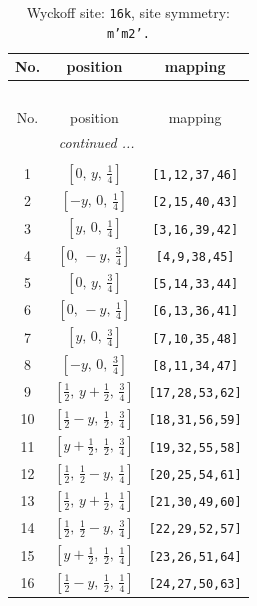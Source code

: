 \documentclass[fleqn,8pt]{jsarticle}
\begin{document}
\renewcommand{\arraystretch}{1.2}
\begin{longtable}{ccc}
\caption{Wyckoff site: {\tt 16k}, site symmetry: {\tt m'm2'.}}
 \\
 \hline \hline
No. & position & mapping \\ \hline \endfirsthead

\multicolumn{2}{l}{\tablename\ \thetable{}} \\
 \hline \hline
No. & position & mapping \\ \hline \endhead

 \hline \hline
\multicolumn{2}{r}{\footnotesize\it continued ...} \\ \endfoot

 \hline \hline
\multicolumn{2}{r}{} \\ \endlastfoot

1 & $\left[ 0,\, y,\, \frac{1}{4} \right]$ & {\tt [1,12,37,46]} \\ \hline
2 & $\left[ - y,\, 0,\, \frac{1}{4} \right]$ & {\tt [2,15,40,43]} \\ \hline
3 & $\left[ y,\, 0,\, \frac{1}{4} \right]$ & {\tt [3,16,39,42]} \\ \hline
4 & $\left[ 0,\, - y,\, \frac{3}{4} \right]$ & {\tt [4,9,38,45]} \\ \hline
5 & $\left[ 0,\, y,\, \frac{3}{4} \right]$ & {\tt [5,14,33,44]} \\ \hline
6 & $\left[ 0,\, - y,\, \frac{1}{4} \right]$ & {\tt [6,13,36,41]} \\ \hline
7 & $\left[ y,\, 0,\, \frac{3}{4} \right]$ & {\tt [7,10,35,48]} \\ \hline
8 & $\left[ - y,\, 0,\, \frac{3}{4} \right]$ & {\tt [8,11,34,47]} \\ \hline
9 & $\left[ \frac{1}{2},\, y + \frac{1}{2},\, \frac{3}{4} \right]$ & {\tt [17,28,53,62]} \\ \hline
10 & $\left[ \frac{1}{2} - y,\, \frac{1}{2},\, \frac{3}{4} \right]$ & {\tt [18,31,56,59]} \\ \hline
11 & $\left[ y + \frac{1}{2},\, \frac{1}{2},\, \frac{3}{4} \right]$ & {\tt [19,32,55,58]} \\ \hline
12 & $\left[ \frac{1}{2},\, \frac{1}{2} - y,\, \frac{1}{4} \right]$ & {\tt [20,25,54,61]} \\ \hline
13 & $\left[ \frac{1}{2},\, y + \frac{1}{2},\, \frac{1}{4} \right]$ & {\tt [21,30,49,60]} \\ \hline
14 & $\left[ \frac{1}{2},\, \frac{1}{2} - y,\, \frac{3}{4} \right]$ & {\tt [22,29,52,57]} \\ \hline
15 & $\left[ y + \frac{1}{2},\, \frac{1}{2},\, \frac{1}{4} \right]$ & {\tt [23,26,51,64]} \\ \hline
16 & $\left[ \frac{1}{2} - y,\, \frac{1}{2},\, \frac{1}{4} \right]$ & {\tt [24,27,50,63]} \\
\end{longtable}
\end{document}
